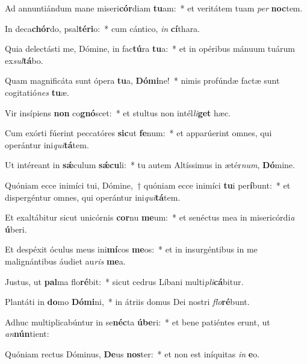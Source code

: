 \item Ad annuntiándum mane miseri\textbf{cór}diam \textbf{tu}am:~* et veritátem tuam \textit{per} \textbf{noc}tem.
\item In deca\textbf{chór}do, psal\textbf{té}\textbf{ri}o:~* cum cántico, \textit{in} \textbf{cí}thara.
\item Quia delectásti me, Dómine, in fac\textbf{tú}ra \textbf{tu}a:~* et in opéribus mánuum tuárum ex\textit{sul}\textbf{tá}bo.
\item Quam magnificáta sunt ópera \textbf{tu}a, \textbf{Dó}\textbf{mi}ne!~* nimis profúndæ factæ sunt cogitatió\textit{nes} \textbf{tu}æ.
\item Vir insípiens \textbf{non} co\textbf{gnó}scet:~* et stultus non intél\textit{li}\textbf{get} hæc.
\item Cum exórti fúerint peccatóres \textbf{sic}ut \textbf{fe}num:~* et apparúerint omnes, qui operántur ini\textit{qui}\textbf{tá}tem.
\item Ut intéreant in \textbf{sǽ}culum \textbf{sǽ}\textbf{cu}li:~* tu autem Altíssimus in ætér\textit{num}, \textbf{Dó}mine.
\item Quóniam ecce inimíci tui, Dómine,~† quóniam ecce inimíci \textbf{tu}i per\textbf{í}bunt:~* et dispergéntur omnes, qui operántur ini\textit{qui}\textbf{tá}tem.
\item Et exaltábitur sicut unicórnis \textbf{cor}nu \textbf{me}um:~* et senéctus mea in misericórdi\textit{a} \textbf{ú}beri.
\item Et despéxit óculus meus ini\textbf{mí}cos \textbf{me}os:~* et in insurgéntibus in me malignántibus áudiet au\textit{ris} \textbf{me}a.
\item Justus, ut \textbf{pal}ma flo\textbf{ré}bit:~* sicut cedrus Líbani multi\textit{pli}\textbf{cá}bitur.
\item Plantáti in \textbf{do}mo \textbf{Dó}\textbf{mi}ni,~* in átriis domus Dei nostri \textit{flo}\textbf{ré}bunt.
\item Adhuc multiplicabúntur in se\textbf{néc}ta \textbf{ú}\textbf{be}ri:~* et bene patiéntes erunt, ut \textit{an}\textbf{nún}tient:
\item Quóniam rectus Dóminus, \textbf{De}us \textbf{nos}ter:~* et non est iníquitas \textit{in} \textbf{e}o.
